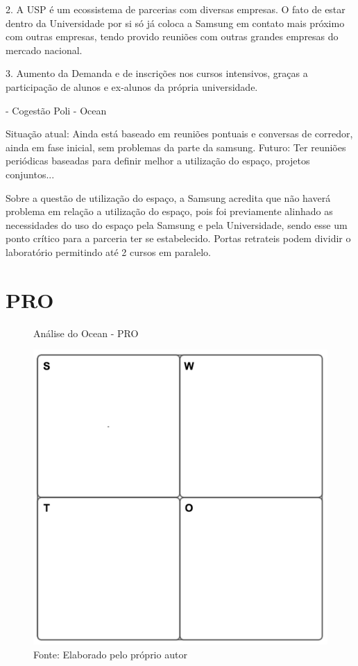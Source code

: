 2. A USP é um ecossistema de parcerias com diversas empresas. O fato de estar dentro da Universidade por si só já coloca a Samsung em contato mais próximo com outras empresas, tendo provido reuniões com outras grandes empresas do mercado nacional.

3. Aumento da Demanda e de inscrições nos cursos intensivos, graças a participação de alunos e ex-alunos da própria universidade. 

- Cogestão Poli - Ocean

Situação atual: Ainda está baseado em reuniões pontuais e conversas de corredor, ainda em fase inicial, sem problemas da parte da samsung.
Futuro: Ter reuniões periódicas baseadas para definir melhor a utilização do espaço, projetos conjuntos...

Sobre a questão de utilização do espaço, a Samsung acredita que não haverá problema em relação a utilização do espaço, pois foi previamente alinhado as necessidades do uso do espaço pela Samsung e pela Universidade, sendo esse um ponto crítico para a parceria ter se estabelecido. Portas retrateis podem dividir o laboratório permitindo até 2 cursos em paralelo. 

\section{PRO}

\begin{figure}[h]
\caption{Análise do Ocean - PRO}
\centerline{\includegraphics[scale=0.5]{img/generalswot}}
\label{fig:swotpro}
\caption* {Fonte: Elaborado pelo próprio autor}
\end{figure}

